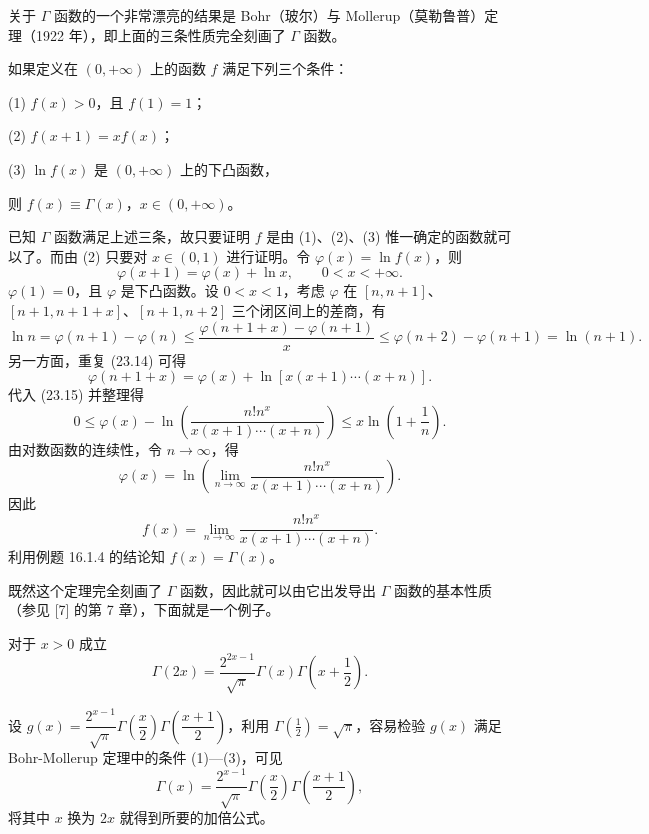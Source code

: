 关于 $\Gamma$ 函数的一个非常漂亮的结果是 Bohr（玻尔）与 Mollerup（莫勒鲁普）定理（1922 年），即上面的三条性质完全刻画了 $\Gamma$ 函数。

\begin{xproposition}
如果定义在 $(0,+\infty)$ 上的函数 $f$ 满足下列三个条件：

(1) $f(x)>0$，且 $f(1)=1$；

(2) $f(x+1)=xf(x)$；

(3) $\ln f(x)$ 是 $(0,+\infty)$ 上的下凸函数，

则 $f(x)\equiv\Gamma(x)$，$x\in(0,+\infty)$。
\end{xproposition}
\begin{xproof}
已知 $\Gamma$ 函数满足上述三条，故只要证明 $f$ 是由 (1)、(2)、(3) 惟一确定的函数就可以了。而由 (2) 只要对 $x\in(0,1)$ 进行证明。令 $\varphi(x)=\ln f(x)$，则
\begin{equation}
  \varphi(x+1)=\varphi(x)+\ln x,\qquad0<x<+\infty.
  \tag{23.14}
\end{equation}
$\varphi(1)=0$，且 $\varphi$ 是下凸函数。设 $0<x<1$，考虑 $\varphi$ 在 $[n,n+1]$、$[n+1,n+1+x]$、$[n+1,n+2]$ 三个闭区间上的差商，有
\begin{equation}
  \ln n=\varphi(n+1)-\varphi(n)\leqslant
  \frac{\varphi(n+1+x)-\varphi(n+1)}{x}
  \leqslant\varphi(n+2)-\varphi(n+1)=\ln(n+1).
  \tag{23.15}
\end{equation}
另一方面，重复 (23.14) 可得
\[
  \varphi(n+1+x)=\varphi(x)+\ln[x(x+1)\cdots(x+n)].
\]
代入 (23.15) 并整理得
\[
  0\leqslant\varphi(x)-\ln\left(\frac{n!n^x}{x(x+1)\cdots(x+n)}\right)
  \leqslant x\ln\left(1+\frac1n\right).
\]
由对数函数的连续性，令 $n\to\infty$，得
\[
  \varphi(x)=\ln\left(\lim_{n\to\infty}\frac{n!n^x}{x(x+1)\cdots(x+n)}\right).
\]
因此
\[
  f(x)=\lim_{n\to\infty}\frac{n!n^x}{x(x+1)\cdots(x+n)}.
\]
利用例题 16.1.4 的结论知 $f(x)=\Gamma(x)$。
\end{xproof}

\begin{xremark}
既然这个定理完全刻画了 $\Gamma$ 函数，因此就可以由它出发导出 $\Gamma$ 函数的基本性质（参见 [7] 的第 7 章），下面就是一个例子。
\end{xremark}

\begin{xproposition}
对于 $x>0$ 成立
\[
  \Gamma(2x)=\frac{2^{2x-1}}{\sqrt\pi}\Gamma(x)\Gamma\left(x+\frac12\right).
\]
\end{xproposition}
\begin{xproof}
设 $g(x)=\dfrac{2^{x-1}}{\sqrt\pi}\Gamma\left(\dfrac x2\right)\Gamma\left(\dfrac{x+1}{2}\right)$，利用 $\Gamma(\frac12)=\sqrt\pi$，容易检验 $g(x)$ 满足 Bohr-Mollerup 定理中的条件 (1)—(3)，可见
\[
  \Gamma(x)=\frac{2^{x-1}}{\sqrt\pi}\Gamma\left(\frac x2\right)\Gamma\left(\frac{x+1}{2}\right),
\]
将其中 $x$ 换为 $2x$ 就得到所要的加倍公式。
\end{xproof}

